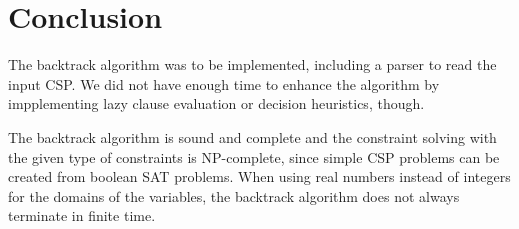 \section{Conclusion}

The backtrack algorithm was to be implemented, including a parser to read the input CSP. We did not have enough time to enhance the algorithm by impplementing lazy clause evaluation or decision heuristics, though. 

The backtrack algorithm is sound and complete and the constraint solving with the given type of constraints is NP-complete, since simple CSP problems can be created from boolean SAT problems. When using real numbers instead of integers for the domains of the variables, the backtrack algorithm does not always terminate in finite time.